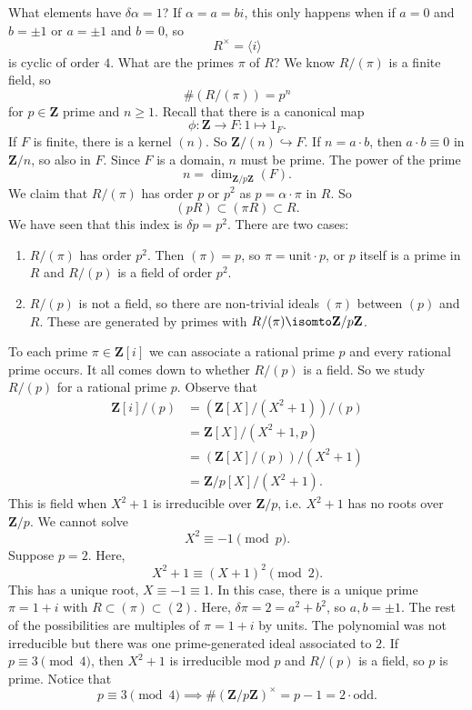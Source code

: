 \documentclass[11pt, oneside]{amsart}
\numberwithin{equation}{section}
\numberwithin{theorem}{section}
\theoremstyle{definition}
\def\Z{\mathbf{Z}}
\begin{document}
{What elements have $\delta\alpha = 1$? If $\alpha = a=bi$, this only happens when if $a = 0$ and $b=\pm 1$ or $a=\pm 1$ and $b=0$, so 
$$
R^\times =\langle i\rangle
$$
is cyclic of order $4$. What are the primes $\pi$ of $R$? We know $R/(\pi)$ is a finite field, so 
$$
\#(R/(\pi)) = p^n
$$
for $p\in \Z$ prime and $n\geqslant 1$. Recall that there is a canonical map 
$$
\phi : \Z\to F : 1\mapsto 1_F.
$$
If $F$ is finite, there is a kernel $(n)$. So $\Z/(n)\hookrightarrow F$. If $n=a\cdot b$, then $a\cdot b \equiv 0$ in $\Z/n$, so also in $F$. Since $F$ is a domain, $n$ must be prime. The power of the prime 
$$
n = \dim_{\Z/p\Z}(F).
$$
We claim that $R/(\pi)$ has order $p$ or $p^2$ as $p=\alpha\cdot \pi$ in $R$. So 
$$
(pR)\subset(\pi R)\subset R.
$$
We have seen that this index is $\delta p = p^2$. There are two cases:
\begin{enumerate}[label=(\roman*)]
\item $R/(\pi)$ has order $p^2$. Then $(\pi) = p$, so $\pi = \mathrm{unit}\cdot p$, or $p$ itself is a prime in $R$ and $R/(p)$ is a field of order $p^2$.
\item $R/(p)$ is not a field, so there are non-trivial ideals $(\pi)$ between $(p)$ and $R$. These are generated by primes with $R/(\pi)\isomto \Z/p\Z$.
\end{enumerate}
To each prime $\pi\in\Z[i]$ we can associate a rational prime $p$ and every rational prime occurs. It all comes down to whether $R/(p)$ is a field. So we study $R/(p)$ for a rational prime $p$. Observe that 
\begin{align*}
\Z[i]/(p) 	&= (\Z[X]/(X^2+1))/(p) \\
		&= \Z[X]/(X^2+1, p) \\
		&= (\Z[X]/(p))/(X^2 + 1) \\
		&= \Z/p[X]/(X^2+1).
\end{align*}
This is field when $X^2 + 1$ is irreducible over $\Z/p$, i.e. $X^2 + 1$ has no roots over $\Z/p$. We cannot solve
$$
X^2\equiv -1\pmod p.
$$ 
Suppose $p=2$. Here,
$$
X^2 + 1 \equiv (X+1)^2\pmod 2.
$$
This has a unique root, $X\equiv -1\equiv 1$. In this case, there is a unique prime $\pi=1+i$ with $R\subset (\pi)\subset(2)$. Here, $\delta \pi=2=a^2+b^2$, so $a,b=\pm 1$. The rest of the possibilities are multiples of $\pi=1+i$ by units. The polynomial was not irreducible but there was one prime-generated ideal associated to $2$. If $p\equiv 3\pmod 4$, then $X^2+1$ is irreducible mod $p$ and $R/(p)$ is a field, so $p$ is prime. Notice that
$$
p\equiv 3\pmod 4 \implies \#(\Z/p\Z)^\times = p-1 = 2\cdot \mathrm{odd}.
$$}
\end{document}
